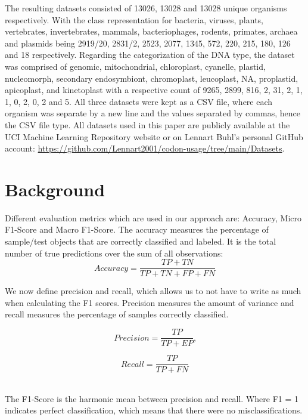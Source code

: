 \documentclass[conference]{IEEEtran}
\begin{document}
The resulting datasets consisted of 13026, 13028 and 13028 unique organisms respectively. With the class representation for bacteria, viruses, plants, vertebrates, invertebrates, mammals, bacteriophages, rodents, primates, archaea and plasmids being 2919/20, 2831/2, 2523, 2077, 1345, 572, 220, 215, 180, 126 and 18 respectively. Regarding the categorization of the DNA type, the dataset was comprised of genomic, mitochondrial, chloroplast, cyanelle, plastid, nucleomorph, secondary endosymbiont, chromoplast, leucoplast, NA, proplastid, apicoplast, and kinetoplast with a respective count of 9265, 2899, 816, 2, 31, 2, 1, 1, 0, 2, 0, 2 and 5. All three datasets were kept as a CSV file, where each organism was separate by a new line and the values separated by commas, hence the CSV file type. 
All datasets used in this paper are publicly available at the UCI Machine Learning Repository website or on Lennart Buhl’s personal GitHub account: \url{https://github.com/Lennart2001/codon-usage/tree/main/Datasets}.


\section{Background}
Different evaluation metrics which are used in our approach are: Accuracy, Micro F1-Score and Macro F1-Score. The accuracy measures the percentage of sample/test objects that are correctly classified and labeled. It is the total number of true predictions over the sum of all observations: 
\begin{equation}
Accuracy = \frac{TP + TN}{TP+TN+FP+FN}
\end{equation}

We now define precision and recall, which allows us to not have to write as much when calculating the F1 scores. Precision measures the amount of variance and recall measures the percentage of samples correctly classified. 

\begin{equation}
Precision = \frac{TP}{TP + EP} \text{,}
\end{equation}

\begin{equation}
Recall = \frac{TP}{TP+FN}
\end{equation}
\\
\vspace{-1em}

The F1-Score is the harmonic mean between precision and recall. Where F1 = 1 indicates perfect classification, which means that there were no misclassifications.
\end{document}
